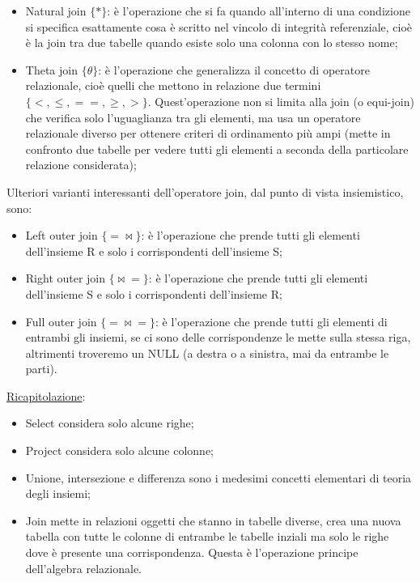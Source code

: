 \begin{itemize}

\item{Natural join $\{*\}$}: è l'operazione che si fa quando all'interno di una condizione si specifica esattamente cosa è scritto nel vincolo di integrità referenziale, cioè è la join tra due tabelle quando esiste solo una colonna con lo stesso nome;

\item{Theta join $\{\theta\}$}: è l'operazione che generalizza il concetto di operatore relazionale, cioè quelli che mettono in relazione due termini $\{<,\leq,==,\geq,>\}$. Quest'operazione non si limita alla join (o equi-join) che verifica solo l'uguaglianza tra gli elementi, ma usa un operatore relazionale diverso per ottenere criteri di ordinamento più ampi (mette in confronto due tabelle per vedere tutti gli elementi a seconda della particolare relazione considerata);

\end{itemize}

Ulteriori varianti interessanti dell'operatore join, dal punto di vista insiemistico, sono:

\begin{itemize}

\item{Left outer join $\{=\Join\}$}: è l'operazione che prende tutti gli elementi dell'insieme R e solo i corrispondenti dell'insieme S;
\item{Right outer join $\{\Join=\}$}: è l'operazione che prende tutti gli elementi dell'insieme S e solo i corrispondenti dell'insieme R;
\item{Full outer join $\{=\Join=\}$}:  è l'operazione che prende tutti gli elementi di entrambi gli insiemi, se ci sono delle corrispondenze le mette sulla stessa riga, altrimenti troveremo un NULL (a destra o a sinistra, mai da entrambe le parti).

\end{itemize}

\underline{Ricapitolazione}:

\begin{itemize}

\item Select considera solo alcune righe;
\item Project considera solo alcune colonne;
\item Unione, intersezione e differenza sono i medesimi concetti elementari di teoria degli insiemi;
\item Join mette in relazioni oggetti che stanno in tabelle diverse, crea una nuova tabella con tutte le colonne di entrambe le tabelle inziali ma solo le righe dove è presente una corrispondenza. Questa è l'operazione principe dell'algebra relazionale. 

\end{itemize}



